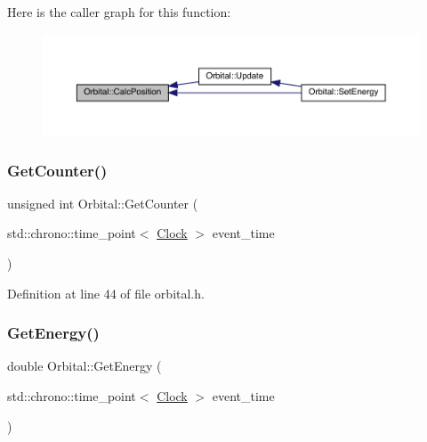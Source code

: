 Here is the caller graph for this function\+:
\nopagebreak
\begin{figure}[H]
\begin{center}
\leavevmode
\includegraphics[width=350pt]{class_orbital_a5aa5edbae517ff393fc1eb0ae2422123_icgraph}
\end{center}
\end{figure}
\mbox{\label{class_orbital_ae46443496d38a22f1da8f7f063d420bc}} 
\subsubsection{\texorpdfstring{Get\+Counter()}{GetCounter()}}
{\footnotesize\ttfamily unsigned int Orbital\+::\+Get\+Counter (\begin{DoxyParamCaption}\item[{std\+::chrono\+::time\+\_\+point$<$ \hyperlink{universe_8h_a0ef8d951d1ca5ab3cfaf7ab4c7a6fd80}{Clock} $>$}]{event\+\_\+time }\end{DoxyParamCaption})\hspace{0.3cm}{\ttfamily [inline]}}



Definition at line 44 of file orbital.\+h.

\mbox{\label{class_orbital_a6748a8f75bfd255c1a53a5061d4e14e1}} 
\subsubsection{\texorpdfstring{Get\+Energy()}{GetEnergy()}}
{\footnotesize\ttfamily double Orbital\+::\+Get\+Energy (\begin{DoxyParamCaption}\item[{std\+::chrono\+::time\+\_\+point$<$ \hyperlink{universe_8h_a0ef8d951d1ca5ab3cfaf7ab4c7a6fd80}{Clock} $>$}]{event\+\_\+time }\end{DoxyParamCaption})\hspace{0.3cm}{\ttfamily [inline]}}



